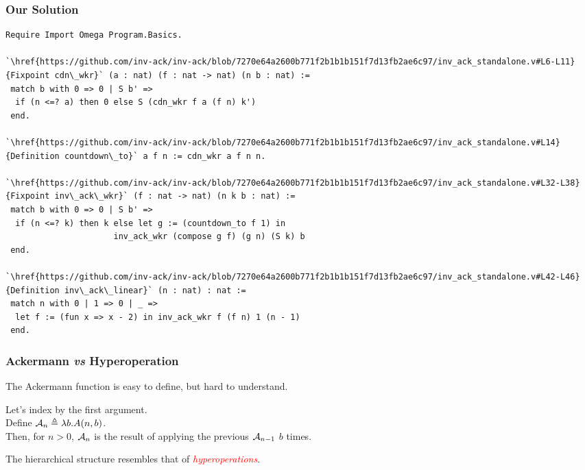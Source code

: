 \begin{frame}[fragile]
\frametitle{Our Solution}

\vspace{-1em}
\lstset{style=myTinyStyle}
\begin{mdframed}[backgroundcolor=lightgray, roundcorner=10pt,leftmargin=0, rightmargin=0, innerleftmargin=0, innertopmargin=-5,innerbottommargin=-5, outerlinewidth=0, linecolor=lightgray]
\begin{lstlisting}
Require Import Omega Program.Basics.

`\href{https://github.com/inv-ack/inv-ack/blob/7270e64a2600b771f2b1b1b151f7d13fb2ae6c97/inv_ack_standalone.v#L6-L11}{Fixpoint cdn\_wkr}` (a : nat) (f : nat -> nat) (n b : nat) :=
 match b with 0 => 0 | S b' =>
  if (n <=? a) then 0 else S (cdn_wkr f a (f n) k')
 end.

`\href{https://github.com/inv-ack/inv-ack/blob/7270e64a2600b771f2b1b1b151f7d13fb2ae6c97/inv_ack_standalone.v#L14}{Definition countdown\_to}` a f n := cdn_wkr a f n n.

`\href{https://github.com/inv-ack/inv-ack/blob/7270e64a2600b771f2b1b1b151f7d13fb2ae6c97/inv_ack_standalone.v#L32-L38} {Fixpoint inv\_ack\_wkr}` (f : nat -> nat) (n k b : nat) :=
 match b with 0 => 0 | S b' =>
  if (n <=? k) then k else let g := (countdown_to f 1) in
                      inv_ack_wkr (compose g f) (g n) (S k) b
 end.

`\href{https://github.com/inv-ack/inv-ack/blob/7270e64a2600b771f2b1b1b151f7d13fb2ae6c97/inv_ack_standalone.v#L42-L46}{Definition inv\_ack\_linear}` (n : nat) : nat :=
 match n with 0 | 1 => 0 | _ => 
  let f := (fun x => x - 2) in inv_ack_wkr f (f n) 1 (n - 1)
 end.
\end{lstlisting}
\end{mdframed} 
\end{frame}


\begin{frame}
\frametitle{Ackermann \emph{vs} Hyperoperation}

The Ackermann function is easy to define, but hard to
understand.

\bigskip

\pause 	
Let's index by the first argument. \\ \smallskip
Define $\mathcal{A}_n \triangleq \lambda b.A(n,b)$. \\ \smallskip
Then, for $n>0$, $\mathcal{A}_n$ is the result of applying the previous $\mathcal{A}_{n-1}$ $b$ times.


\bigskip

\pause 
The hierarchical structure resembles that of \textcolor{red}{\emph{hyperoperations}}.

\end{frame}


